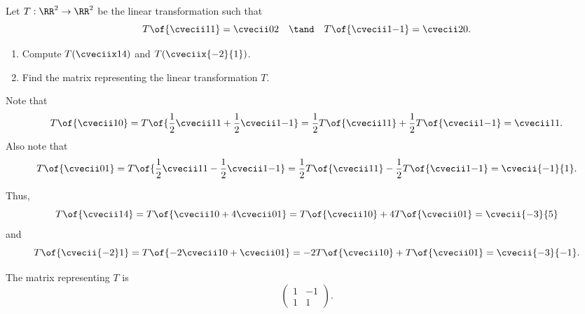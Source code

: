 \begin{problem}
    Let $T : \RR^2 \to \RR^2$ be the linear transformation such that \[T\of{\cvecii11} = \cvecii02 \quad \tand \quad T\of{\cvecii1{-1}} = \cvecii20.\]

    \begin{enumerate}
        \item Compute $T(\cveciix14)$ and $T(\cveciix{-2}{1})$.
        \item Find the matrix representing the linear transformation $T$.
    \end{enumerate}
\end{problem}
\begin{solution}
    \begin{ppart}
        Note that \[T\of{\cvecii10} = T\of{\frac12 \cvecii11 + \frac12 \cvecii1{-1}} = \frac12 T\of{\cvecii11} + \frac12 T\of{\cvecii1{-1}} = \cvecii11.\] Also note that \[T\of{\cvecii01} = T\of{\frac12 \cvecii11 - \frac12 \cvecii1{-1}} = \frac12 T\of{\cvecii11} - \frac12 T\of{\cvecii1{-1}} = \cvecii{-1}{1}.\]

        Thus, \[T\of{\cvecii14} = T\of{\cvecii10 + 4\cvecii01} = T\of{\cvecii10} + 4T\of{\cvecii01} = \cvecii{-3}{5}\] and \[T\of{\cvecii{-2}1} = T\of{-2\cvecii10 + \cvecii01} = -2 T\of{\cvecii10} + T\of{\cvecii01} = \cvecii{-3}{-1}.\]
    \end{ppart}
    \begin{ppart}
        The matrix representing $T$ is \[\begin{pmatrix}1 & -1 \\ 1 & 1\end{pmatrix}.\]
    \end{ppart}
\end{solution}

